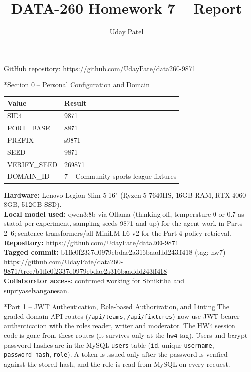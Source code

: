 \documentclass[11pt]{article}
\title{DATA-260 Homework 7 -- Report}
\author{Uday Patel}
\date{}
\makeatletter
\renewcommand\section{\@startsection{section}{1}{\z@}{-3.0ex \@plus -1ex \@minus -.2ex}{1.2ex \@plus.2ex}{\normalfont\fontsize{14}{17}\selectfont\bfseries}}
\makeatother
\begin{document}
\maketitle
\begin{center}GitHub repository: \url{https://github.com/UdayPate/data260-9871}\end{center}

\section*{Section 0 -- Personal Configuration and Domain}
\begin{tabular}{|l|l|}\hline
\textbf{Value} & \textbf{Result} \\\hline
SID4 & 9871 \\\hline
PORT\_BASE & 8871 \\\hline
PREFIX & s9871 \\\hline
SEED & 9871 \\\hline
VERIFY\_SEED & 269871 \\\hline
DOMAIN\_ID & 7 -- Community sports league fixtures \\\hline
\end{tabular}
\vspace{1em}

\textbf{Hardware:} Lenovo Legion Slim 5 16" (Ryzen 5 7640HS, 16GB RAM, RTX 4060 8GB, 512GB SSD). \\
\textbf{Local model used:} qwen3:8b via Ollama (thinking off, temperature 0 or 0.7 as stated per experiment, sampling seeds 9871 and up) for the agent work in Parts 2--6; sentence-transformers/all-MiniLM-L6-v2 for the Part 4 policy retrieval. \\
\textbf{Repository:} \url{https://github.com/UdayPate/data260-9871} \\
\textbf{Tagged commit:} b1ffc0f2337d0979ebdae2a316baaddd243ff418 (tag: hw7) \\
{\footnotesize\url{https://github.com/UdayPate/data260-9871/tree/b1ffc0f2337d0979ebdae2a316baaddd243ff418}} \\
\textbf{Collaborator access:} confirmed working for Sbnikitha and supriyaselvanganesan.

\section*{Part 1 -- JWT Authentication, Role-based Authorization, and Linting}
The graded domain API routes (\texttt{/\allowbreak{}api/\allowbreak{}teams}, \texttt{/\allowbreak{}api/\allowbreak{}fixtures}) now use JWT bearer authentication with the roles reader, writer and moderator. The HW4 session code is gone from these routes (it survives only at the \texttt{hw4} tag). Users and bcrypt password hashes are in the MySQL \texttt{users} table (\texttt{id}, unique \texttt{username}, \texttt{password\_\allowbreak{}hash}, \texttt{role}). A token is issued only after the password is verified against the stored hash, and the role is read from MySQL on every request.
\end{document}
